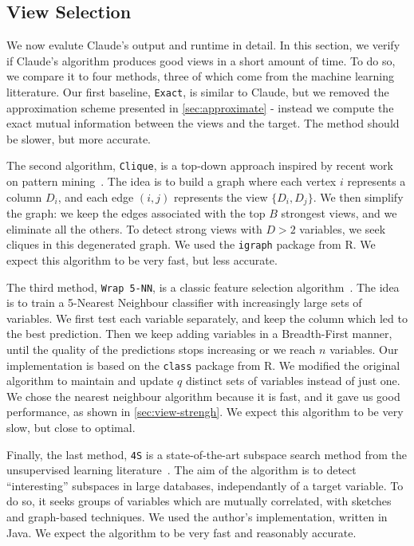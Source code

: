 \subsection{View Selection}
\label{sec:exp-view-selection}

We now evalute Claude's output and runtime in detail. In this section, we
verify if Claude's algorithm produces good views in a short amount of time. To
do so, we compare it to four methods, three of which come from the machine
learning litterature.  Our first baseline, \texttt{Exact}, is similar to
Claude, but we removed the approximation scheme presented in
\ref{sec:approximate} - instead we compute the exact mutual information between
the views and the target. The method should be slower, but more accurate. 

The second algorithm, \texttt{Clique}, is a top-down approach inspired by
recent work on pattern mining~\cite{xie2010max}. The idea is to build a graph
where each vertex $i$ represents a column $D_i$, and each edge $(i,j)$
represents the view $\{D_i, D_j\}$. We then simplify the graph: we keep the
edges associated with the top $B$ strongest views, and we eliminate all the
others. To detect strong views with $D >2$ variables, we seek cliques in this
degenerated graph. We used the \texttt{igraph} package from R. We expect this
algorithm to be very fast, but less accurate.

The third method, \texttt{Wrap 5-NN}, is a classic feature selection
algorithm~\cite{guyon2003introduction}. The idea is to train a 5-Nearest
Neighbour classifier with increasingly large sets of variables. We first test
each variable separately, and keep the column which led to the best prediction.
Then we keep adding variables in a Breadth-First manner, until the
quality of the predictions stops increasing or we reach $n$ variables. Our
implementation is based on the \texttt{class} package from R.  We modified the
original algorithm to maintain and update $q$ distinct sets of variables
instead of just one. We chose the nearest neighbour algorithm because it is
fast, and it gave us good performance, as shown in \ref{sec:view-strengh}. We
expect this algorithm to be very slow, but close to optimal.

Finally, the last method, \texttt{4S} is a state-of-the-art subspace search
method from the unsupervised learning literature~\cite{nguyen20134s}. The aim
of the algorithm is to detect ``interesting'' subspaces in large databases,
independantly of a target variable. To do so, it seeks groups of variables
which are mutually correlated, with sketches and graph-based techniques.  We
used the author's implementation, written in Java. We expect the algorithm to
be very fast and reasonably accurate.

